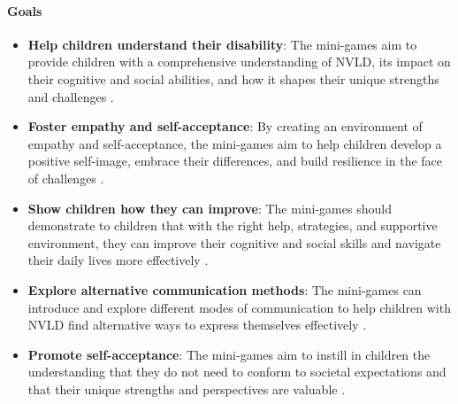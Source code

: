 \paragraph{Goals}
\begin{itemize}
    \item \textbf{Help children understand their disability}: The mini-games aim to provide children with a comprehensive understanding of NVLD, its impact on their cognitive and social abilities, and how it shapes their unique strengths and challenges \cite{understood_nvld_2024}.
    \item \textbf{Foster empathy and self-acceptance}: By creating an environment of empathy and self-acceptance, the mini-games aim to help children develop a positive self-image, embrace their differences, and build resilience in the face of challenges \cite{understood_nvld_2024}.
    \item \textbf{Show children how they can improve}: The mini-games should demonstrate to children that with the right help, strategies, and supportive environment, they can improve their cognitive and social skills and navigate their daily lives more effectively \cite{jama_nvld_2024}.
    \item \textbf{Explore alternative communication methods}: The mini-games can introduce and explore different modes of communication to help children with NVLD find alternative ways to express themselves effectively \cite{understood_accommodations_2024}.
    \item \textbf{Promote self-acceptance}: The mini-games aim to instill in children the understanding that they do not need to conform to societal expectations and that their unique strengths and perspectives are valuable \cite{understood_nvld_adult_2024}.
\end{itemize}


